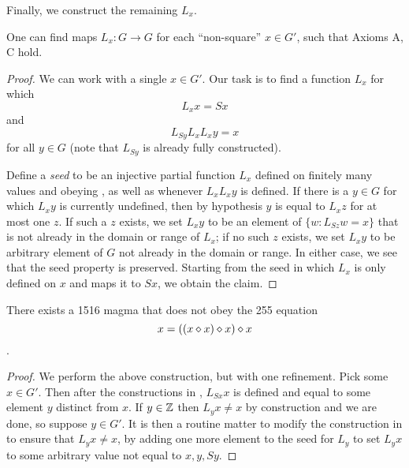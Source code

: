 Finally, we construct the remaining $L_x$.

\begin{proposition}\label{axiom-c} One can find maps $L_x: G \to G$ for each ``non-square'' $x \in G'$, such that Axioms A, C hold.
\end{proposition}

\begin{proof}  We can work with a single $x \in G'$.  Our task is to find a function $L_x$ for which
\begin{equation}\label{axioma-again}
   L_x x = Sx
\end{equation}
and
\begin{equation}\label{axiomb-again}
  L_{Sy} L_x L_x y = x
\end{equation}
for all $y \in G$ (note that $L_{Sy}$ is already fully constructed).

Define a \emph{seed} to be an injective partial function $L_x$ defined on finitely many values and obeying , as well as  whenever $L_x L_x y$ is defined.  If there is a $y \in G$ for which $L_x y$ is currently undefined, then by hypothesis $y$ is equal to $L_x z$ for at most one $z$.  If such a $z$ exists, we set $L_x y$ to be an element of $\{ w: L_{Sz} w = x \}$ that is not already in the domain or range of $L_x$; if no such $z$ exists, we set $L_x y$ to be arbitrary element of $G$ not already in the domain or range.  In either case, we see that the seed property is preserved.  Starting from the seed in which $L_x$ is only defined on $x$ and maps it to $Sx$, we obtain the claim.
\end{proof}

\begin{corollary}\label{1516-no-255}  There exists a 1516 magma that does not obey the 255 equation $$x = ((x \diamond x) \diamond x) \diamond x$$.
\end{corollary}

\begin{proof}  We perform the above construction, but with one refinement.  Pick some $x \in G'$.  Then after the constructions in , $L_{Sx} x$ is defined and equal to some element $y$ distinct from $x$. If $y \in \mathbb{Z}$ then $L_y x \neq x$ by construction and we are done, so suppose $y \in G'$.  It is then a routine matter to modify the construction in  to ensure that $L_y x \neq x$, by adding one more element to the seed for $L_y$ to set $L_y x$ to some arbitrary value not equal to $x, y, Sy$.
\end{proof}
